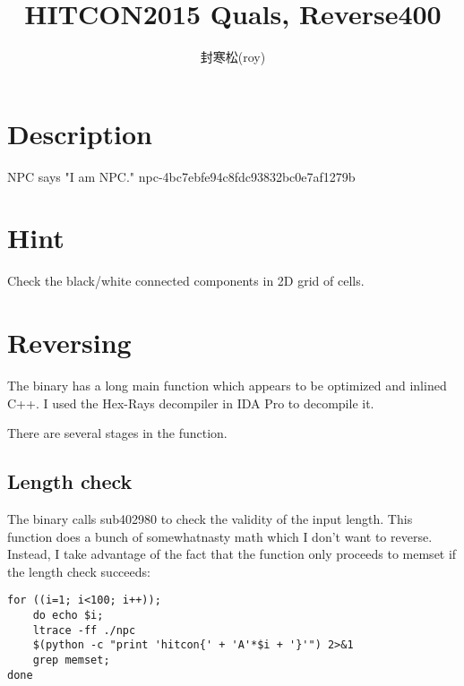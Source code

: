\documentclass[a4paper,UTF8]{ctexart}
\title{HITCON2015 Quals, Reverse400}
\author{封寒松(roy)}
\affil{哈尔滨工业大学，计算机科学与技术学院，royfhs@163.com}
\date{}
\begin{document}
\maketitle


\section{Description}

\begin{quizdesc}[label=Reverse400 NPC]
NPC says "I am NPC."
npc-4bc7ebfe94c8fdc93832bc0e7af1279b
\end{quizdesc}
  
\section{Hint}

Check the black/white connected components in 2D grid of cells.

\section{Reversing}

The binary has a long main function which appears to be optimized and inlined C++. I used the Hex-Rays decompiler in IDA Pro to decompile it.

    There are several stages in the function.
    
  \subsection{Length check}
  
  The binary calls sub402980 to check the validity of the input length. This function does a bunch of somewhatnasty math which I don't want to reverse. Instead, I take advantage of the fact that the function only proceeds to memset if the length check succeeds:

\begin{verbatim}
for ((i=1; i<100; i++));
    do echo $i;
    ltrace -ff ./npc
    $(python -c "print 'hitcon{' + 'A'*$i + '}'") 2>&1
    grep memset;
done
\end{verbatim}
      
\end{document}

